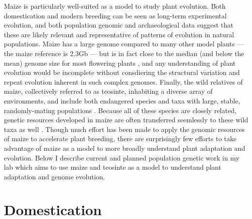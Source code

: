 \documentclass[11pt]{article}
\begin{document}
\noindent Maize is particularly well-suited as a model to study plant evolution.
Both domestication and modern breeding can be seen as long-term experimental evolution, and both population genomic \citep{hufford2012comparative} and archaeological \citep{purugganan2011archaeological} data suggest that these are likely relevant and representative of patterns of evolution in natural populations.
Maize has a large genome compared to many other model plants --- the maize reference is 2.3Gb \citep{schnable2009the-b73-maize} ---  but is in fact  close to the median (and below the mean) genome size for most flowering plants \citep{leitch2013genome}, and any understanding of plant evolution would be incomplete without consdiering the structural variation and repeat evolution inherent in such complex genomes.
Finally, the wild relatives of maize, collectively referred to as teosinte, inhabiting a diverse array of environments, and include both endangered species and taxa with large, stable, randomly-mating populations \citep{hufford2012teosinte}.
Because all of these species are closely related, genetic resources developed in maize are often transferred seemlessly to these wild taxa as well \citep[e.g.][]{pyhajarvi2013complex,fang2012megabase}.
Though much effort has been made to apply the genomic resources of maize to accelerate plant breeding, there are surprisingly few efforts to take advantage of maize as a model to more broadly understand plant adaptation and evolution.  
Below I describe current and planned population genetic work in my lab which aims to use maize and teosinte as a model to understand plant adaptation and genome evolution.  

\section*{Domestication}
\end{document}
